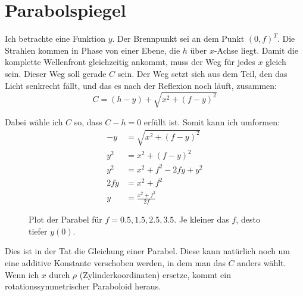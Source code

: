 \documentclass[11pt, ngerman, fleqn]{article}
\begin{document}

\section{Parabolspiegel}
\label{4}

Ich betrachte eine Funktion $y$. Der Brennpunkt sei an dem Punkt $(0, f)^T$.
Die Strahlen kommen in Phase von einer Ebene, die $h$ über $x$-Achse liegt.
Damit die komplette Wellenfront gleichzeitig ankommt, muss der Weg für jedes
$x$ gleich sein. Dieser Weg soll gerade $C$ sein. Der Weg setzt sich aus dem
Teil, den das Licht senkrecht fällt, und das es nach der Reflexion noch läuft,
zusammen:
\[
	C = (h-y) + \sqrt{x^2 + (f-y)^2}
\]

Dabei wähle ich $C$ so, dass $C - h=0$ erfüllt ist. Somit kann ich umformen:
\begin{align*}
	-y &= \sqrt{x^2 + (f-y)^2} \\
	y^2 &= x^2 + (f-y)^2 \\
	y^2 &= x^2 + f^2 - 2fy + y^2 \\
	2fy &= x^2 + f^2 \\
	  y &= \frac{x^2 + f^2}{2f}
\end{align*}

\begin{figure}
	\centering
	\caption{Plot der Parabel für $f = 0.5, 1.5, 2.5, 3.5$. Je kleiner das $f$, desto tiefer $y(0)$.}
	\label{fig:}
\end{figure}

Dies ist in der Tat die Gleichung einer Parabel. Diese kann natürlich noch um
eine additive Konstante verschoben werden, in dem man das $C$ anders wählt.
Wenn ich $x$ durch $\rho$ (Zylinderkoordinaten) ersetze, kommt
ein rotationssymmetrischer Paraboloid heraus.

%
%
\end{document}
